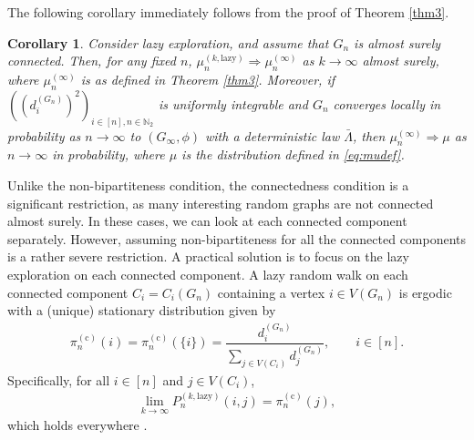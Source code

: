 \documentclass[11pt]{article}
\numberwithin{equation}{section}
\theoremstyle{plain}
\newtheorem{corollary}[theorem]{Corollary}
\newcommand{\N}{\mathbb N}
\newcommand{\weak}{\Longrightarrow}
\newcommand{\dn}{d^{(G_{n})}}
\begin{document}
The following corollary immediately follows from the proof of Theorem \ref{thm3}.

\begin{corollary} 
\label{cor}
Consider lazy exploration, and assume that $G_n$ is almost surely connected. Then, for any fixed $n$, $\mu_{n}^{(k,\mathrm{lazy})} \weak \mu_{n}^{(\infty)}$ as $k \to \infty$ almost surely, where $\mu_{n}^{(\infty)}$ is as defined in Theorem \ref{thm3}. Moreover, if $((\dn_{i})^{2})_{i \in [n], n \in \N_2}$ is uniformly integrable and $G_n$ converges locally in probability as $n\to\infty$ to $(G_{\infty}, \phi)$ with a deterministic law $\bar{\Lambda}$, then $\mu_n^{(\infty)} \weak \mu$ as $n \to \infty$ in probability, where $\mu$ is the distribution defined in \eqref{eq:mudef}. 
\end{corollary}

Unlike the non-bipartiteness condition, the connectedness condition is a significant restriction, as many interesting random graphs are not connected almost surely. In these cases, we can look at each connected component separately. However, assuming non-bipartiteness for all the connected components is a rather severe restriction. A practical solution is to focus on the lazy exploration on each connected component. A lazy random walk on each connected component $C_{i}=C_{i}(G_{n})$ containing a vertex $i\in V(G_{n})$ is ergodic with a (unique) stationary distribution given by 
\begin{align*}
\pi_{n}^{(\mathrm{c})}(i) = \pi_{n}^{(\mathrm{c})}(\{i\})=\dfrac{\dn_{i}}{\sum_{j\in V(C_{i})}\dn_{j}}, \qquad i\in [n].
\end{align*}
Specifically, for all $i\in [n]$ and $j\in V(C_{i})$,
\begin{align}
\label{statlim2}
\lim_{k \rightarrow \infty} P_{n}^{(k,\mathrm{lazy})}(i,j)=\pi_{n}^{(\mathrm{c})}(j),
\end{align}
which holds everywhere \cite[Theorem 1.8.3]{N}. 
\end{document}
